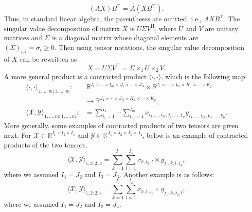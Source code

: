 \[(AX)B^{\top}=A(XB^{\top}).\]
{Thus, in standard linear algebra, the parentheses are omitted, i.e., $AXB^{\top}$. The singular value decomposition of matrix $X$ is $U\Sigma V^{\mathrm H}$, where $U$ and $V$ are unitary matrices and $\Sigma$ is a diagonal matrix whose diagonal elements are $(\Sigma)_{i,i}=\sigma_i\ge0$. Then using tensor notations, the singular value decomposition of $X$ can be rewritten as}
\[X=U\Sigma V^{\top}=\Sigma\times_1U\times_2V.\]
{A more general product is a contracted product $\langle\cdot,\cdot\rangle$, which is the following map:}
\[\begin{aligned}
\langle\cdot,\cdot\rangle_{1,\ldots,m;1,\ldots,m}:&\ \mathbb{R}^{I_1\times\cdots\times I_m\times J_1\times\cdots\times J_N}\times\mathbb{R}^{I_1\times\cdots\times I_m\times K_1\times\cdots\times K_p}\\
&\to\mathbb{R}^{J_1\times\cdots\times J_N\times K_1\times\cdots\times K_p},\\
\langle\mathcal{X},\mathcal{Y}\rangle_{1,\ldots,m;1,\ldots,m}:&=\sum_{i_1=1}^{I_1}\cdots\sum_{i_m=1}^{I_m}x_{i_1,\ldots,i_m,j_1,\ldots,j_N}y_{i_1,\ldots,i_m,k_1,\ldots,k_p}.
\end{aligned}\]
{More generally, some examples of contracted products of two tensors are given next. For $\mathcal{X}\in\mathbb{R}^{I_1\times I_2\times I_3}$ and $\mathcal{Y}\in\mathbb{R}^{J_1\times J_2\times J_3\times J_4}$, below is an example of contracted products of the two tensors.}
\[\langle\mathcal{X},\mathcal{Y}\rangle_{1,3:2,3}=\sum_{k=1}^{I_1}\sum_{l=1}^{I_3}x_{k,i_2,l}\times y_{j_1,k,l,j_4},\]
{where we assumed $I_1=J_2$ and $I_3=J_3$. Another example is as follows:}
\[\langle\mathcal{X},\mathcal{Y}\rangle_{1,2:2,4}=\sum_{k=1}^{I_1}\sum_{l=1}^{I_2}x_{k,l,i_3}\times y_{j_1,k,j_3,l},\]
{where we assumed $I_1=J_2$ and $I_2=J_4$.}
